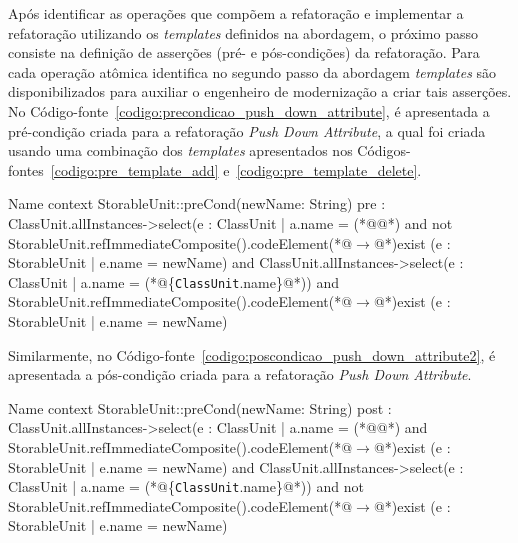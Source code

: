 Após identificar as operações que compõem a refatoração e implementar a refatoração utilizando os \textit{templates} definidos na abordagem, o próximo passo consiste na definição de asserções (pré- e pós-condições) da refatoração. Para cada operação atômica identifica no segundo passo da abordagem \textit{templates} são disponibilizados para auxiliar o engenheiro de modernização a criar tais asserções. No Código-fonte~\ref{codigo:precondicao_push_down_attribute}, é apresentada a pré-condição criada para a refatoração \textit{Push Down Attribute}, a qual foi criada usando uma combinação dos \textit{templates} apresentados nos Códigos-fontes~\ref{codigo:pre_template_add} e~\ref{codigo:pre_template_delete}. 


\begin{codigo}[caption={[Pré-condição da refatoração \textit{Push Down Attribute}.] Pré-condição da refatoração \textit{Push Down Attribute}.},escapeinside={(*@}{@*)}, basicstyle=\footnotesize, label={codigo:precondicao_push_down_attribute}, language=OCL]{Name}
context StorableUnit::preCond(newName: String)
pre : ClassUnit.allInstances->select(e : ClassUnit | a.name = (*@@*) and not StorableUnit.refImmediateComposite().codeElement(*@$\rightarrow$@*)exist (e : StorableUnit | e.name = newName) 
and ClassUnit.allInstances->select(e : ClassUnit | a.name = (*@\{\texttt{ClassUnit}.name\}@*)) and StorableUnit.refImmediateComposite().codeElement(*@$\rightarrow$@*)exist (e : StorableUnit | e.name = newName)
\end{codigo}

Similarmente, no Código-fonte~\ref{codigo:poscondicao_push_down_attribute2}, é apresentada a pós-condição criada para a refatoração \textit{Push Down Attribute}.

\begin{codigo}[caption={[Pós-condição da refatoração \textit{Push Down Attribute}.] Pós-condição da refatoração \textit{Push Down Attribute}.},escapeinside={(*@}{@*)}, basicstyle=\footnotesize, label={codigo:poscondicao_push_down_attribute2}, language=OCL]{Name}
context StorableUnit::preCond(newName: String)
post : ClassUnit.allInstances->select(e : ClassUnit | a.name = (*@@*) and StorableUnit.refImmediateComposite().codeElement(*@$\rightarrow$@*)exist (e : StorableUnit | e.name = newName) 
and ClassUnit.allInstances->select(e : ClassUnit | a.name = (*@\{\texttt{ClassUnit}.name\}@*)) and not StorableUnit.refImmediateComposite().codeElement(*@$\rightarrow$@*)exist (e : StorableUnit | e.name = newName)
\end{codigo}



